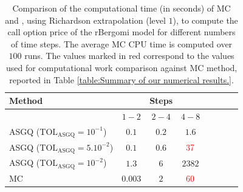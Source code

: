 \begin{table}[h!]
	\centering
	\begin{tabular}{l*{6}{c}r}
		\toprule[1.5pt]
	Method & & Steps  & &     \\
	\hline
		          & $1-2$ & $2-4$ & $4-8$   \\
		\hline
		ASGQ ($\text{TOL}_{\text{ASGQ}}=10^{-1}$)  & $0.1$ & $0.2$ & $1.6$  \\
		ASGQ ($\text{TOL}_{\text{ASGQ}}=5.10^{-2}$)  & $0.1$ & $0.6$ & ${\color{red}37}$  \\
		ASGQ ($\text{TOL}_{\text{ASGQ}}=10^{-2}$)  & $1.3$ & $6$ & $2382$  \\
		

			\hline	
		MC  &$0.003$ & $2$  & ${\color{red}60}$   \\
		
		\bottomrule[1.25pt]
		\end{tabular}
		\caption{Comparison of the computational time (in seconds) of  MC and , using Richardson extrapolation (level $1$), to compute the call option price of the rBergomi model for different numbers of time steps. The average MC CPU time is computed over $100$ runs. The values marked in red correspond to the values used for computational work comparison against MC method, reported in Table \ref{table:Summary of our numerical results.}.}
		\label{Comparsion of the computational time of  MC and MISC, using Richardson extrapolation (level $1$), used to compute Call option price of rBergomi model for different number of time steps. Case set $2$ parameters,linear}
		\end{table}
		
		\FloatBarrier
		
